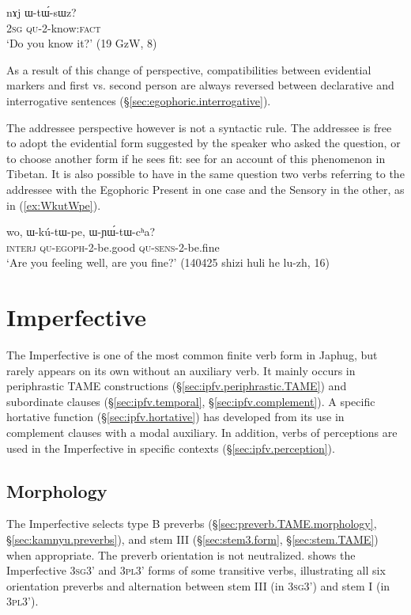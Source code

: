 \begin{exe}
\ex \label{ex:WtWsWz}
\gll nɤj ɯ-tɯ́-sɯz? \\
\textsc{2sg} \textsc{qu}-2-know:\textsc{fact} \\
\glt `Do you know it?' (19 GzW, 8)
\end{exe}

As a result of this change of perspective, compatibilities between evidential markers and first vs. second person are always reversed between declarative and interrogative sentences  (§\ref{sec:egophoric.interrogative}).

The addressee perspective however is not a syntactic rule. The addressee is free to adopt the evidential form suggested by the speaker who asked the question, or to choose another form if he sees fit: see \citet{garrett07symbiosis} for an account of this phenomenon in Tibetan. It is also possible to have in the same question two verbs referring to the addressee with the Egophoric Present in one case and the Sensory in the other, as in (\ref{ex:WkutWpe}). 

\begin{exe}
\ex \label{ex:WkutWpe}
\gll wo, ɯ-kú-tɯ-pe, ɯ-ɲɯ́-tɯ-cʰa? \\
\textsc{interj} \textsc{qu}-\textsc{egoph}-2-be.good \textsc{qu}-\textsc{sens}-2-be.fine \\
\glt `Are you feeling well, are you fine?' (140425 shizi huli he lu-zh, 16)
\end{exe}

  \section{Imperfective} \label{sec:imperfective}
 The Imperfective is one of the most common finite verb form in Japhug, but rarely appears on its own without an auxiliary verb. It mainly occurs in periphrastic TAME constructions (§\ref{sec:ipfv.periphrastic.TAME}) and subordinate clauses (§\ref{sec:ipfv.temporal}, §\ref{sec:ipfv.complement}). A specific hortative function (§\ref{sec:ipfv.hortative}) has developed from its use in complement clauses with a modal auxiliary. In addition, verbs of perceptions are used in the Imperfective in specific contexts (§\ref{sec:ipfv.perception}).
  
  
  \subsection{Morphology} \label{sec:ipfv.morphology}
The Imperfective selects type B preverbs (§\ref{sec:preverb.TAME.morphology}, §\ref{sec:kamnyu.preverbs}), and stem III (§\ref{sec:stem3.form}, §\ref{sec:stem.TAME}) when appropriate. The preverb orientation is not neutralized.  shows the Imperfective \textsc{3sg}\fl{}3' and \textsc{3pl}\fl{}3' forms of some transitive verbs, illustrating all six orientation preverbs and alternation between stem III (in \textsc{3sg}\fl{}3') and stem I (in \textsc{3pl}\fl{}3').
 
